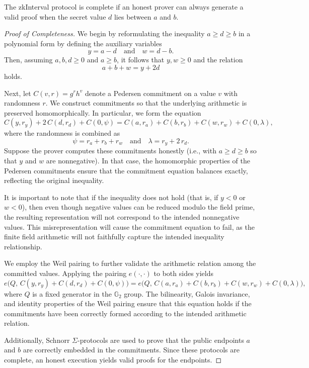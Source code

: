 \documentclass[version=preprint]{iacrcc}
\begin{document}
The zkInterval protocol is complete if an honest prover can always generate a valid proof when the secret value \( d \) lies between \( a \) and \( b \).

\begin{proof}[Proof of Completeness]
  We begin by reformulating the inequality \(a \geq d \geq b\) in a polynomial form by defining the auxiliary variables
  \[
  y = a - d \quad \text{and} \quad w = d - b.
  \]
  Then, assuming \(a, b, d \geq 0\) and \(a \geq b\), it follows that \(y, w \geq 0\) and the relation
  \[
  a + b + w = y + 2d
  \]
  holds.
  
  Next, let \( C(v, r) = g^{r} h^{v} \) denote a Pedersen commitment on a value \(v\) with randomness \(r\). We construct commitments so that the underlying arithmetic is preserved homomorphically. In particular, we form the equation
  \[
  C(y, r_y) + 2\,C(d, r_d) + C(0, \psi) = C(a, r_a) + C(b, r_b) + C(w, r_w) + C(0, \lambda),
  \]
  where the randomness is combined as
  \[
  \psi = r_a + r_b + r_w \quad \text{and} \quad \lambda = r_y + 2\,r_d.
  \]
  Suppose the prover computes these commitments honestly (i.e., with \(a \geq d \geq b\) so that \(y\) and \(w\) are nonnegative). In that case, the homomorphic properties of the Pedersen commitments ensure that the commitment equation balances exactly, reflecting the original inequality.
  
  It is important to note that if the inequality does not hold (that is, if \(y < 0\) or \(w < 0\)), then even though negative values can be reduced modulo the field prime, the resulting representation will not correspond to the intended nonnegative values. This misrepresentation will cause the commitment equation to fail, as the finite field arithmetic will not faithfully capture the intended inequality relationship.
  
  We employ the Weil pairing to further validate the arithmetic relation among the committed values. Applying the pairing \(e(\cdot,\cdot)\) to both sides yields
  \[
  e\Big(Q,\, C(y, r_y) + C(d, r_d) + C(0, \psi)\Big) = e\Big(Q,\, C(a, r_a) + C(b, r_b) + C(w, r_w) + C(0, \lambda)\Big),
  \]
  where \(Q\) is a fixed generator in the \( \mathbb{G}_{2} \) group. The bilinearity, Galois invariance, and identity properties of the Weil pairing ensure that this equation holds if the commitments have been correctly formed according to the intended arithmetic relation.
  
  Additionally, Schnorr \(\Sigma\)-protocols are used to prove that the public endpoints \(a\) and \(b\) are correctly embedded in the commitments. Since these protocols are complete, an honest execution yields valid proofs for the endpoints.
  

\end{proof}
\end{document}
